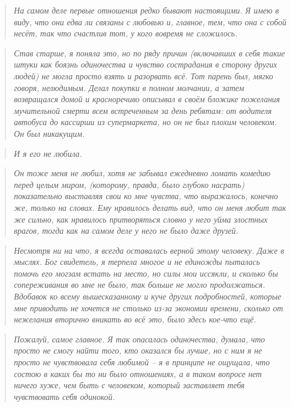 \documentclass[
  a5paperpaper,
  DIV=11,
  numbers=noendperiod]{scrreprt}
\begin{document}
\begin{quote}
\emph{На самом деле первые отношения редко бывают настоящими. Я имею в
виду, что они едва ли связаны с любовью и, главное, тем, что она с собой
несёт, так что счастлив тот, у кого вовремя не сложилось.}
\end{quote}

\begin{quote}
\emph{Став старше, я поняла это, но по ряду причин (включавших в себя
такие штуки как боязнь одиночества и чувство сострадания в сторону
других людей) не могла просто взять и разорвать всё. Тот парень был,
мягко говоря, нелюдимым. Делал покупки в полном молчании, а затем
возвращался домой и красноречиво описывал в своём бложике пожелания
мучительной смерти всем встреченным за день ребятам: от водителя
автобуса до кассирши из супермаркета, но он не был плохим человеком. Он
был никакущим.}
\end{quote}

\begin{quote}
\emph{И я его не любила.}
\end{quote}

\begin{quote}
\emph{Он тоже меня не любил, хотя не забывал ежедневно ломать комедию
перед целым миром, (которому, правда, было глубоко насрать) показательно
выставляя свои ко мне чувства, что выражалось, конечно же, только на
словах. Ему нравилось делать вид, что он меня любит так же сильно, как
нравилось притворяться словно у него уйма злостных врагов, тогда как на
самом деле у него не было даже друзей.}
\end{quote}

\begin{quote}
\emph{Несмотря ни на что, я всегда оставалась верной этому человеку.
Даже в мыслях. Бог свидетель, я терпела многое и не единожды пыталась
помочь его могзам встать на место, но силы мои иссякли, и сколько бы
сопереживания во мне не было, так больше не могло продолжаться. Вдобавок
ко всему вышесказанному и куче других подробностей, которые мне
приводить не хочется не столько из-за экономии времени, сколько от
нежелания вторично вникать во всё это, было здесь кое-что ещё.}
\end{quote}

\begin{quote}
\emph{Пожалуй, самое главное. Я так опасалась одиночества, думала, что
просто не смогу найти того, кто оказался бы лучше, но с ним я не просто
не чувствовала себя любимой -- я в принципе не ощущала, что состою в
каких бы то ни было отношениях, а в таком вопросе нет ничего хуже, чем
быть с человеком, который заставляет тебя чувствовать себя одинокой.}
\end{quote}
\end{document}
